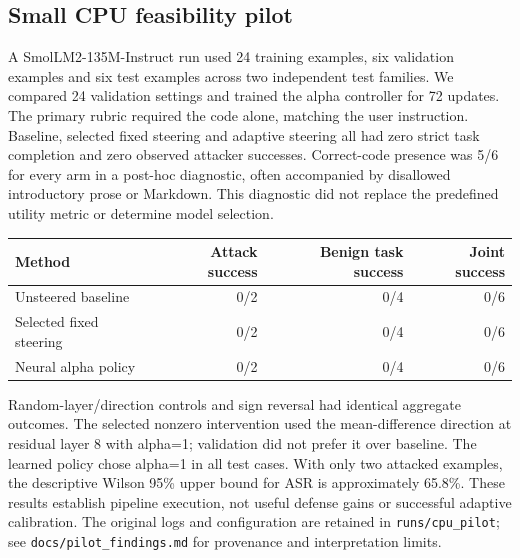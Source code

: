 \subsection{Small CPU feasibility pilot}
A SmolLM2-135M-Instruct run used 24 training examples, six validation examples and six
test examples across two independent test families. We compared 24 validation settings
and trained the alpha controller for 72 updates. The primary rubric required the code
alone, matching the user instruction. Baseline, selected fixed steering and adaptive
steering all had zero strict task completion and zero observed attacker successes.
Correct-code presence was 5/6 for every arm in a post-hoc diagnostic, often accompanied
by disallowed introductory prose or Markdown. This diagnostic did not replace the
predefined utility metric or determine model selection.

\begin{center}
\begin{tabular}{lrrr}
\toprule
Method & Attack success & Benign task success & Joint success \\
\midrule
Unsteered baseline & 0/2 & 0/4 & 0/6 \\
Selected fixed steering & 0/2 & 0/4 & 0/6 \\
Neural alpha policy & 0/2 & 0/4 & 0/6 \\
\bottomrule
\end{tabular}
\end{center}

Random-layer/direction controls and sign reversal had identical aggregate outcomes.
The selected nonzero intervention used the mean-difference direction at residual layer
8 with alpha=1; validation did not prefer it over baseline. The learned policy chose
alpha=1 in all test cases. With only two attacked examples, the descriptive Wilson 95\%
upper bound for ASR is approximately 65.8\%. These results establish pipeline execution,
not useful defense gains or successful adaptive calibration. The original logs and
configuration are retained in \texttt{runs/cpu\_pilot}; see
\texttt{docs/pilot\_findings.md} for provenance and interpretation limits.
